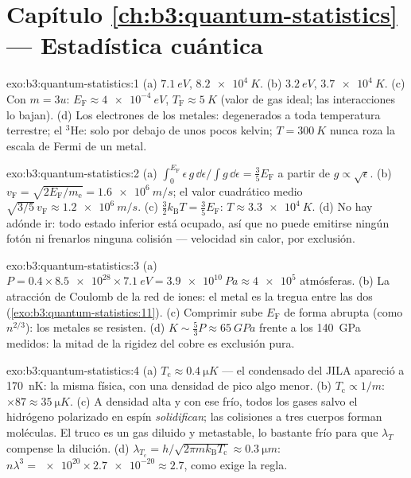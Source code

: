 \section*{Capítulo \ref{ch:b3:quantum-statistics} --- Estadística cuántica}

\begin{solution}{exo:b3:quantum-statistics:1}
(a) $\qty{7.1}{eV}$, $\qty{8.2e4}{K}$. (b) $\qty{3.2}{eV}$,
$\qty{3.7e4}{K}$. (c) Con $m = 3u$: $E_{\text{F}} \approx
\qty{4e-4}{eV}$, $T_{\text{F}} \approx \qty{5}{K}$ (valor de gas
ideal; las interacciones lo bajan). (d) Los electrones de los metales:
degenerados a toda temperatura terrestre; el $^3$He: solo por debajo de unos
pocos kelvin; $T = \qty{300}{K}$ nunca roza la escala de Fermi de un metal.
\end{solution}

\begin{solution}{exo:b3:quantum-statistics:2}
(a) $\int_0^{E_{\text{F}}}\epsilon\,g\,\dd\epsilon/\int g\,\dd
\epsilon = \tfrac35 E_{\text{F}}$ a partir de $g \propto \sqrt\epsilon$.
(b) $v_{\text{F}} = \sqrt{2E_{\text{F}}/m_{\text{e}}} =
\qty{1.6e6}{m/s}$; el valor cuadrático medio $\sqrt{3/5}\,v_{\text{F}} \approx
\qty{1.2e6}{m/s}$. (c) $\tfrac32 k_{\text{B}}T = \tfrac35
E_{\text{F}}$: $T \approx \qty{3.3e4}{K}$. (d) No hay adónde
ir: todo estado inferior está ocupado, así que no puede emitirse ningún fotón
ni frenarlos ninguna colisión --- velocidad sin calor, por exclusión.
\end{solution}

\begin{solution}{exo:b3:quantum-statistics:3}
(a) $P = 0.4 \times \num{8.5e28} \times \qty{7.1}{eV} =
\qty{3.9e10}{Pa} \approx \num{4e5}$ atmósferas. (b) La atracción de
Coulomb de la red de iones: el metal es la tregua entre las
dos (\cref{exo:b3:quantum-statistics:11}). (c) Comprimir sube
$E_{\text{F}}$ de forma abrupta (como $n^{2/3}$): los metales se resisten. (d) $K \sim
\tfrac53 P \approx \qty{65}{GPa}$ frente a los
\qty{140}{GPa} medidos: la mitad de la rigidez del cobre es exclusión pura.
\end{solution}

\begin{solution}{exo:b3:quantum-statistics:4}
(a) $T_{\text{c}} \approx \qty{0.4}{\micro K}$ --- el condensado del
JILA apareció a \qty{170}{nK}: la misma física, con una densidad de pico
algo menor. (b) $T_{\text{c}} \propto 1/m$: $\times87 \approx
\qty{35}{\micro K}$. (c) A densidad alta y con ese frío, todos los gases
salvo el hidrógeno polarizado en espín \emph{solidifican}; las colisiones a
tres cuerpos forman moléculas. El truco es un gas diluido y metastable,
lo bastante frío para que $\lambda_T$ compense la dilución. (d)
$\lambda_{T_{\text{c}}} = h/\sqrt{2\pi mk_{\text{B}}T_{\text{c}}}
\approx \qty{0.3}{\micro m}$: $n\lambda^3 = \num{e20} \times
\num{2.7e-20} \approx 2.7$, como exige la regla.
\end{solution}

